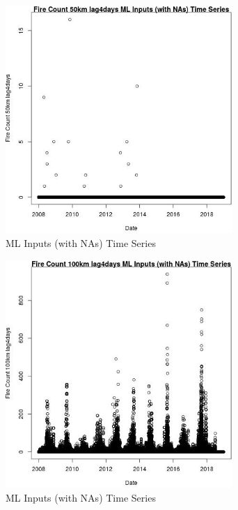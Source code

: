 \begin{figure} 
\centering  
\includegraphics[width=0.77\textwidth]{Code_Outputs/Report_ML_input_PM25_Step4_part_e_de_duplicated_aves_compiled_2019-05-21wNAs_Fire_Count_50km_lag4daysvDate.jpg} 
\caption{\label{fig:Report_ML_input_PM25_Step4_part_e_de_duplicated_aves_compiled_2019-05-21wNAsFire_Count_50km_lag4daysvDate}ML Inputs (with NAs) Time Series} 
\end{figure} 
 

\begin{figure} 
\centering  
\includegraphics[width=0.77\textwidth]{Code_Outputs/Report_ML_input_PM25_Step4_part_e_de_duplicated_aves_compiled_2019-05-21wNAs_Fire_Count_100km_lag4daysvDate.jpg} 
\caption{\label{fig:Report_ML_input_PM25_Step4_part_e_de_duplicated_aves_compiled_2019-05-21wNAsFire_Count_100km_lag4daysvDate}ML Inputs (with NAs) Time Series} 
\end{figure} 
 

